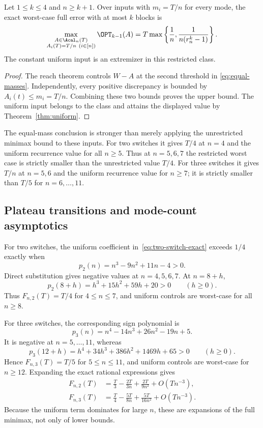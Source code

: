 \begin{corollary}\label{cor:equal-masses}
Let $1\le k\le4$ and $n\ge k+1$. Over inputs with $m_i=T/n$ for every
mode, the exact worst-case full error with at most $k$ blocks is
\begin{equation}\label{eq:equal-masses}
 \max_{\substack{A\in\Acal_n(T)\\A_i(T)=T/n\ (i\in[n])}}
       \OPT_{k-1}(A)
 =T\max\left\{\frac1n,\frac1{n(r_n^k-1)}\right\}.
\end{equation}
The constant uniform input is an extremizer in this restricted class.
\end{corollary}
\begin{proof}
The reach theorem controls $W-A$ at the second threshold in
\eqref{eq:equal-masses}. Independently, every positive discrepancy is
bounded by $A_i(t)\le m_i=T/n$. Combining these two bounds proves the
upper bound. The uniform input belongs to the class and attains the
displayed value by Theorem~\ref{thm:uniform}.
\end{proof}

The equal-mass conclusion is stronger than merely applying the unrestricted
minimax bound to these inputs. For two switches it gives $T/4$ at $n=4$
and the uniform recurrence value for all $n\ge5$. Thus at $n=5,6,7$ the
restricted worst case is strictly smaller than the unrestricted value
$T/4$. For three switches it gives $T/n$ at $n=5,6$ and the uniform
recurrence value for $n\ge7$; it is strictly smaller than $T/5$ for
$n=6,\ldots,11$.

\subsection{Plateau transitions and mode-count asymptotics}

For two switches, the uniform coefficient in~\eqref{eq:two-switch-exact}
exceeds $1/4$ exactly when
\[
 p_2(n)=n^3-9n^2+11n-4>0.
\]
Direct substitution gives negative values at $n=4,5,6,7$. At $n=8+h$,
\[
 p_2(8+h)=h^3+15h^2+59h+20>0\qquad(h\ge0).
\]
Thus $F_{n,2}(T)=T/4$ for $4\le n\le7$, and uniform controls are
worst-case for all $n\ge8$.

For three switches, the corresponding sign polynomial is
\[
 p_3(n)=n^4-14n^3+26n^2-19n+5.
\]
It is negative at $n=5,\ldots,11$, whereas
\[
 p_3(12+h)=h^4+34h^3+386h^2+1469h+65>0\qquad(h\ge0).
\]
Hence $F_{n,3}(T)=T/5$ for $5\le n\le11$, and uniform controls are
worst-case for $n\ge12$. Expanding the exact rational expressions gives
\begin{align}
 F_{n,2}(T)&=\frac T3-\frac{2T}{3n}+\frac{2T}{9n^2}
                      +O(Tn^{-3}),\label{eq:two-switch-expansion}\\
 F_{n,3}(T)&=\frac T4-\frac{5T}{8n}+\frac{5T}{16n^2}
                      +O(Tn^{-3}).\label{eq:three-switch-expansion}
\end{align}
Because the uniform term dominates for large $n$, these are expansions of
the full minimax, not only of lower bounds.


